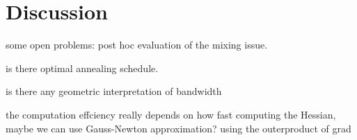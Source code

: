 \section{Discussion} \label{sec:discuss}
some open problems: post hoc evaluation of the mixing issue. 

is there optimal annealing schedule.

is there any geometric interpretation of bandwidth

the computation effciency really depends on how fast computing the Hessian, maybe we can use Gauss-Newton approximation? using the outerproduct of grad